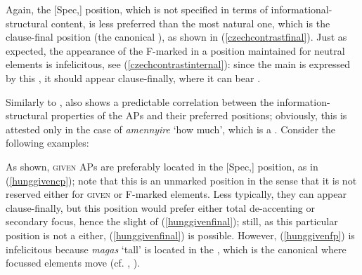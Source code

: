 Again, the [Spec,] position, which is not specified in terms of informational-structural content, is less preferred than the most natural one, which is the clause-final position (the canonical ), as shown in (\ref{czechcontrastfinal}). Just as expected, the appearance of the F-marked  in a position maintained for neutral elements is infelicitous, see (\ref{czechcontrastinternal}): since the main  is expressed by this , it should appear clause-finally, where it can bear .

Similarly to ,  also shows a predictable correlation between the information-structural properties of the APs and their preferred positions; obviously, this is attested only in the case of \textit{amennyire} `how much', which is a  . Consider the following examples:

\ea \label{hunggiven}
\z
\z

As shown, \textsc{given} APs are preferably located in the [Spec,] position, as in (\ref{hunggivencp}); note that this is an unmarked position in the sense that it is not reserved either for \textsc{given} or F-marked elements. Less typically, they can appear clause-finally, but this position would prefer either total de-accenting or secondary focus, hence the slight  of (\ref{hunggivenfinal}); still, as this particular position is not a  either, (\ref{hunggivenfinal}) is possible. However, (\ref{hunggivenfp}) is infelicitous because \textit{magas} `tall' is located in the , which is the canonical  where focussed elements move (cf. \citealt{brody1990, brody1995}, \citealt{ekiss2002}).

